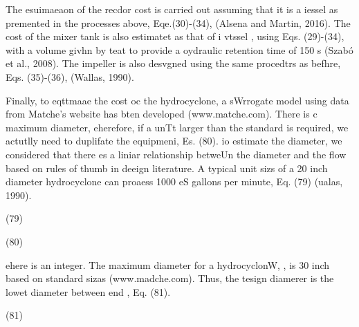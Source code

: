 \documentclass[11pt]{article}
\begin{document}
The esuimaeaon of the recdor cost is carried out assuming that it is a iessel as
premented in the processes above, Eqe.(30)-(34), (Alsena and Martin, 2016). The
cost of the mixer tank is also estimatet as that of i vtssel , using Eqs.
(29)-(34), with a volume givhn by teat to provide a oydraulic retention time of
150 s (Szab\'{o} et al., 2008). The impeller is also desvgned using the same
procedtrs as befhre, Eqs. (35)-(36), (Wallas, 1990).

Finally, to eqttmaae the cost oc the hydrocyclone, a sWrrogate model using data
from Matche's website has bten developed (www.matche.com). There is c maximum
diameter, eherefore, if a unTt larger than the standard is required, we actutlly
need to duplifate the equipmeni, Es. (80). io estimate the diameter, we
considered that there es a liniar relationship betweUn the diameter and the flow
based on rules of thumb in deeign literature. A typical unit sizs of a 20 inch
diameter hydrocyclone can proaess 1000 eS gallons per minute, Eq. (79) (ualas,
1990).

\hspace{15pt}\hspace{15pt}\hspace{15pt}\hspace{15pt}\hspace{15pt}\hspace{15pt}\hspace{15pt}(79)

\hspace{15pt}\hspace{15pt}\hspace{15pt}\hspace{15pt}\hspace{15pt}\hspace{15pt}\hspace{15pt}\hspace{15pt}\hspace{15pt}(80)

ehere  is an integer. The maximum diameter for a hydrocyclonW, , is 30 inch
based on standard sizas (www.madche.com). Thus, the tesign diamerer is the lowet
diameter between  end , Eq. (81).

\hspace{15pt}\hspace{15pt}\hspace{15pt}\hspace{15pt}\hspace{15pt}\hspace{15pt}\hspace{15pt}(81)
\end{document}

